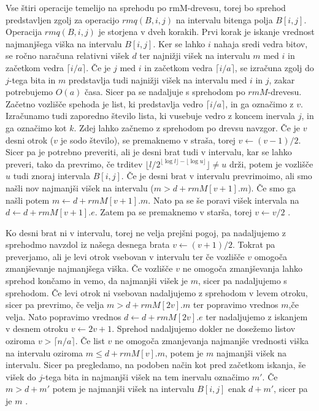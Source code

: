 Vse štiri operacije temelijo na sprehodu po rmM-drevesu, torej bo sprehod predstavljen zgolj za operacijo $rmq(B,i,j)$ na intervalu bitenga polja $B[i,j]$. Operacija $rmq(B,i,j)$ je storjena v dveh korakih. Prvi korak je iskanje vrednost najmanjšega viška na intervalu $B[i,j]$. Ker se lahko $i$ nahaja sredi vedra bitov, se ročno naračuna relativni višek $d$ ter najnižji višek na intervalu $m$ med $i$ in začetkom vedra $\lceil i/a\rceil$. Če je $j$ med $i$ in začetkom vedra  $\lceil i/a\rceil$, se izračuna zgolj do $j$-tega bita in $m$ predstavlja tudi najnižji višek na intervalu med $i$ in $j$, zakar potrebujemo $O(a)$ časa. Sicer pa se nadaljuje s sprehodom po $rmM$-drevesu. Začetno vozlišče spehoda je list, ki predstavlja vedro  $\lceil i/a\rceil$, in ga označimo z $v$. Izračunamo tudi zaporedno število lista, ki vusebuje vedro z koncem inervala $j$, in ga označimo kot $k$. Zdej lahko začnemo z sprehodom po drevsu navzgor. Če je $v$ desni otrok ($v$ je sodo število), se premaknemo v straša, torej $v\leftarrow (v-1)/2$. Sicer pa je potrebno preveriti, ali je desni brat tudi v intervalu, kar se lahko preveri, tako da prevrimo, če trditev $\lfloor l/2^{\lfloor \log l\rfloor- \lfloor \log u \rfloor}\rfloor\ne u$ drži, potem je vozlišče $u$ tudi znoraj intervala $B[i,j]$. Če je desni brat v intervalu prevrimoimo, ali smo našli nov najmanjši višek na intervalu ($m>d+rmM[v+1].m$). Če smo ga našli potem $m\leftarrow d+rmM[v+1].m$. Nato pa se še poravi višek intervala na $d\leftarrow d+rmM[v+1].e$. Zatem pa se premaknemo v starša, torej $v\leftarrow v/2$ \cite{Navarro2016}.

Ko desni brat ni v intervalu, torej ne velja prejšni pogoj, pa nadaljujemo z sprehodmo navzdol iz našega desnega brata $v\leftarrow (v+1)/2$. Tokrat pa preverjamo, ali je levi otrok vsebovan v intervalu ter če vozlišče $v$ omogoča zmanjševanje najmanjšega viška. Če vozlišče $v$ ne omogoča zmanjševanja lahko sprehod končamo in vemo, da najmanjši višek je $m$, sicer pa nadaljujemo s sprehodom. Če levi otrok ni vsebovan nadaljujemo z sprehodom v levem otroku, sicer pa prevrimo, če velja $m>d+rmM[2v].m$ ter popravimo vrednos $m$,če velja. Nato popravimo vrednos $d\leftarrow d+rmM[2v].e$ ter nadaljujemo z iskanjem v desnem otroku $v\leftarrow 2v+1$. Sprehod nadaljujemo dokler ne dosežemo listov oziroma $v>\lceil n/a\rceil$. Če list $v$ ne omogoča zmanjevanja najmanjše vrednosti viška na intervalu oziroma $m\le d+rmM[v].m$, potem je $m$ najmanjši višek na intervalu. Sicer pa pregledamo, na podoben način kot pred začetkom iskanja, še višek do $j$-tega bita in najmanjši višek na tem inervalu označimo $m'$. Če $m>d+m'$ potem je najmanjši višek na intervalu $B[i,j]$ enak $d+m'$, sicer pa je $m$ \cite{Navarro2016}. 

